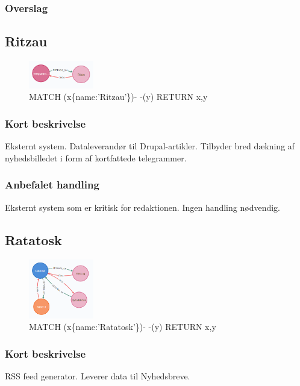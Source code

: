 \documentclass{article}
\begin{document}
\subsubsection{Overslag}


\subsection{Ritzau}
\begin{figure}[h]
\includegraphics[width=80pt]{Ritzau.PNG}
\caption{MATCH (x\{name:'Ritzau'\})- -(y) RETURN x,y}
\end{figure}
\subsubsection{Kort beskrivelse}
Eksternt system. Dataleverandør til Drupal-artikler.
Tilbyder bred dækning af nyhedsbilledet i form af kortfattede telegrammer.
\subsubsection{Anbefalet handling}
Eksternt system som er kritisk for redaktionen. Ingen handling nødvendig.



\subsection{Ratatosk}
\begin{figure}[h]
\includegraphics[width=80pt]{Ratatosk.PNG}
\caption{MATCH (x\{name:'Ratatosk'\})- -(y) RETURN x,y}
\end{figure}
\subsubsection{Kort beskrivelse}
RSS feed generator. Leverer data til Nyhedsbreve.
\end{document}
